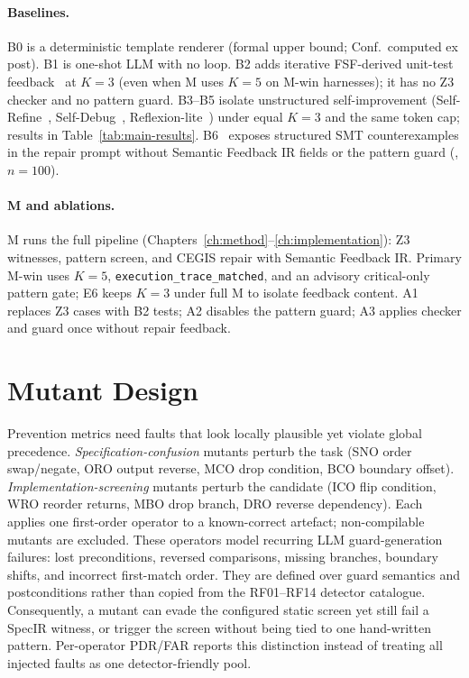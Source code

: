 \paragraph{Baselines.}
B0 is a deterministic template renderer (formal upper bound; Conf.\ computed
ex post).
B1 is one-shot LLM with no loop.
B2 adds iterative FSF-derived unit-test feedback~\citep{zhu1997specification}
at $K{=}3$ (even when M uses $K{=}5$ on M-win harnesses); it has no Z3 checker and no pattern
guard.
B3--B5 isolate unstructured self-improvement
(Self-Refine~\citep{madaan2023selfrefine}, Self-Debug~\citep{chen2024selfdebug},
Reflexion-lite~\citep{shinn2023reflexion}) under equal $K{=}3$ and the same
token cap; results in Table~\ref{tab:main-results}.
B6~\citep{sun2024clover} exposes structured SMT counterexamples in the repair
prompt without Semantic Feedback IR fields or the pattern guard
(, $n{=}100$).

\paragraph{M and ablations.}
M runs the full pipeline (Chapters~\ref{ch:method}--\ref{ch:implementation}):
Z3 witnesses, pattern screen, and CEGIS repair with Semantic Feedback IR.
Primary M-win uses $K{=}5$, \texttt{execution\_trace\_matched}, and an advisory
critical-only pattern gate; E6 keeps $K{=}3$ under full M to isolate feedback
content.
A1 replaces Z3 cases with B2 tests; A2 disables the pattern guard; A3 applies
checker and guard once without repair feedback.

\section{Mutant Design}
\label{sec:exp:mutants}

Prevention metrics need faults that look locally plausible yet violate global
precedence.
\emph{Specification-confusion} mutants perturb the task (SNO order swap/negate,
ORO output reverse, MCO drop condition, BCO boundary offset).
\emph{Implementation-screening} mutants perturb the candidate (ICO flip
condition, WRO reorder returns, MBO drop branch, DRO reverse dependency).
Each applies one first-order operator to a known-correct artefact;
non-compilable mutants are excluded.
These operators model recurring LLM guard-generation failures: lost
preconditions, reversed comparisons, missing branches, boundary shifts, and
incorrect first-match order.
They are defined over guard semantics and postconditions rather than copied
from the RF01--RF14 detector catalogue.
Consequently, a mutant can evade the configured static screen yet still fail a
SpecIR witness, or trigger the screen without being tied to one hand-written
pattern.
Per-operator PDR/FAR reports this distinction instead of treating
all injected faults as one detector-friendly pool.


